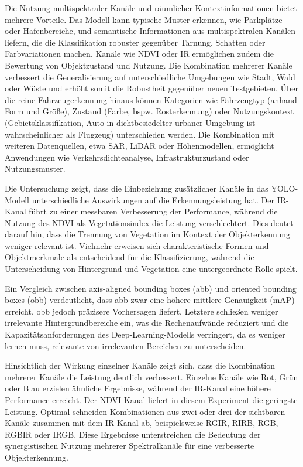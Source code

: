 Die Nutzung multispektraler Kanäle und räumlicher Kontextinformationen bietet mehrere Vorteile. Das Modell kann typische Muster erkennen, wie Parkplätze oder Hafenbereiche, und semantische Informationen aus multispektralen Kanälen liefern, die die Klassifikation robuster gegenüber Tarnung, Schatten oder Farbvariationen machen. Kanäle wie \acrshort{NDVI} oder \acrshort{IR} ermöglichen zudem die Bewertung von Objektzustand und Nutzung. Die Kombination mehrerer Kanäle verbessert die Generalisierung auf unterschiedliche Umgebungen wie Stadt, Wald oder Wüste und erhöht somit die Robustheit gegenüber neuen Testgebieten. Über die reine Fahrzeugerkennung hinaus können Kategorien wie Fahrzeugtyp (anhand Form und Größe), Zustand (Farbe, bspw. Rosterkennung) oder Nutzungskontext (Gebietsklassifikation, Auto in dichtbesiedelter urbaner Umgebung ist wahrscheinlicher als Flugzeug) unterschieden werden. Die Kombination mit weiteren Datenquellen, etwa \acrshort{SAR}, \acrshort{LiDAR} oder Höhenmodellen, ermöglicht Anwendungen wie Verkehrsdichteanalyse, Infrastrukturzustand oder Nutzungsmuster.


Die Untersuchung zeigt, dass die Einbeziehung zusätzlicher Kanäle in das \acrshort{YOLO}-Modell unterschiedliche Auswirkungen auf die Erkennungsleistung hat. Der \acrshort{IR}-Kanal führt zu einer messbaren Verbesserung der Performance, während die Nutzung des \acrshort{NDVI} als Vegetationsindex die Leistung verschlechtert. Dies deutet darauf hin, dass die Trennung von Vegetation im Kontext der Objekterkennung weniger relevant ist. Vielmehr erweisen sich charakteristische Formen und Objektmerkmale als entscheidend für die Klassifizierung, während die Unterscheidung von Hintergrund und Vegetation eine untergeordnete Rolle spielt.  

Ein Vergleich zwischen axis-aligned bounding boxes (\acrshort{abb}) und oriented bounding boxes (\acrshort{obb}) verdeutlicht, dass \acrshort{abb} zwar eine höhere mittlere Genauigkeit (\acrshort{mAP}) erreicht, \acrshort{obb} jedoch präzisere Vorhersagen liefert. Letztere schließen weniger irrelevante Hintergrundbereiche ein, was die Rechenaufwände reduziert und die Kapazitätsanforderungen des Deep-Learning-Modells verringert, da es weniger lernen muss, relevante von irrelevanten Bereichen zu unterscheiden.  

Hinsichtlich der Wirkung einzelner Kanäle zeigt sich, dass die Kombination mehrerer Kanäle die Leistung deutlich verbessert. Einzelne Kanäle wie Rot, Grün oder Blau erzielen ähnliche Ergebnisse, während der \acrshort{IR}-Kanal eine höhere Performance erreicht. Der \acrshort{NDVI}-Kanal liefert in diesem Experiment die geringste Leistung. Optimal schneiden Kombinationen aus zwei oder drei der sichtbaren Kanäle zusammen mit dem \acrshort{IR}-Kanal ab, beispielsweise RGIR, RIRB, RGB, RGBIR oder IRGB. Diese Ergebnisse unterstreichen die Bedeutung der synergistischen Nutzung mehrerer Spektralkanäle für eine verbesserte Objekterkennung.  

